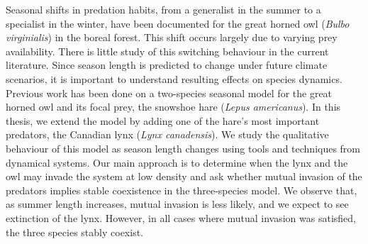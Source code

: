 \documentclass[12pt]{UOthesis}
\theoremstyle{remarkstyle}
\begin{document}

%
%

Seasonal shifts in predation habits, from a generalist in the summer to a specialist in the winter, have been documented for the great horned owl (\textit{Bulbo virginialis}) in the boreal forest. This shift occurs largely due to varying prey availability. There is little study of this switching behaviour in the current literature. Since season length is predicted to change under future climate scenarios, it is important to understand resulting effects on species dynamics. Previous work has been done on a two-species seasonal model for the great horned owl and its focal prey, the snowshoe hare (\textit{Lepus americanus}). In this thesis, we extend the model by adding one of the hare's most important predators, the Canadian lynx (\textit{Lynx canadensis}). We study the qualitative behaviour of this model as season length changes using tools and techniques from dynamical systems. Our main approach is to determine when the lynx and the owl may invade the system at low density and ask whether mutual invasion of the predators implies stable coexistence in the three-species model. We observe that, as summer length increases, mutual invasion is less likely, and we expect to see extinction of the lynx. However, in all cases where mutual invasion was satisfied, the three species stably coexist.

\cleardoublepage

\end{document}
